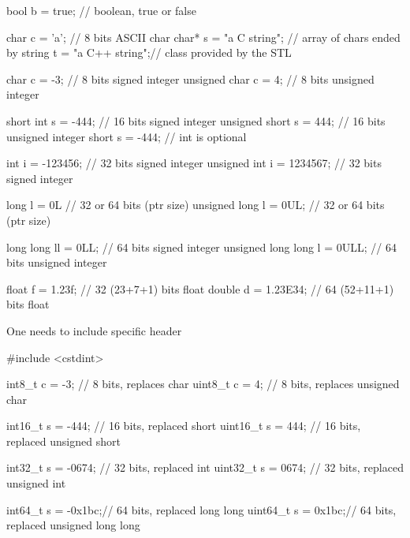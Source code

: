 \begin{frame}[fragile]
  \begin{cppcode}
    bool b = true;            // boolean, true or false
    
    char c = 'a';             // 8 bits ASCII char
    char* s = "a C string";   // array of chars ended by \0
    string t = "a C++ string";// class provided by the STL

    char c = -3;              // 8 bits signed integer
    unsigned char c = 4;      // 8 bits unsigned integer

    short int s = -444;       // 16 bits signed integer
    unsigned short s = 444;   // 16 bits unsigned integer
    short s = -444;           // int is optional
  \end{cppcode}
\end{frame}
\begin{frame}[fragile]
  \begin{cppcode}
    int i = -123456;          // 32 bits signed integer
    unsigned int i = 1234567; // 32 bits signed integer

    long l = 0L               // 32 or 64 bits (ptr size)
    unsigned long l = 0UL;    // 32 or 64 bits (ptr size)

    long long ll = 0LL;       // 64 bits signed integer
    unsigned long long l = 0ULL; // 64 bits unsigned integer

    float f = 1.23f;          // 32 (23+7+1) bits float
    double d = 1.23E34;       // 64 (52+11+1) bits float
  \end{cppcode}
\end{frame}

\begin{frame}[fragile]
  \alert{One needs to include specific header}
  \begin{cppcode}
    #include <cstdint>
    
    int8_t c = -3;     // 8 bits, replaces char
    uint8_t c = 4;     // 8 bits, replaces unsigned char

    int16_t s = -444;  // 16 bits, replaced short
    uint16_t s = 444;  // 16 bits, replaced unsigned short

    int32_t s = -0674; // 32 bits, replaced int
    uint32_t s = 0674; // 32 bits, replaced unsigned int

    int64_t s = -0x1bc;// 64 bits, replaced long long
    uint64_t s = 0x1bc;// 64 bits, replaced unsigned long long
    \end{cppcode}
\end{frame}

